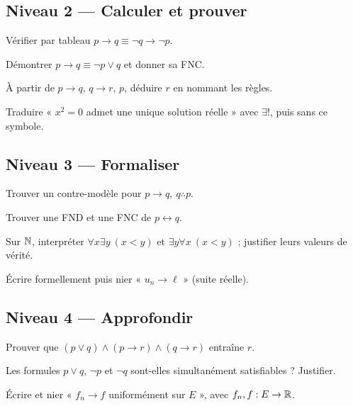 \subsection*{Niveau 2 — Calculer et prouver}
\begin{exercice}[Contraposée]\label{ex:prop:5}Vérifier par tableau $p\to q\equiv\neg q\to\neg p$.\end{exercice}
\begin{exercice}[Équivalence]\label{ex:prop:6}Démontrer $p\to q\equiv\neg p\vee q$ et donner sa FNC.\end{exercice}
\begin{exercice}[Inférence]\label{ex:prop:7}À partir de $p\to q$, $q\to r$, $p$, déduire $r$ en nommant les règles.\end{exercice}
\begin{exercice}[Unicité]\label{ex:prop:8}Traduire « $x^2=0$ admet une unique solution réelle » avec $\exists!$, puis sans ce symbole.\end{exercice}
\subsection*{Niveau 3 — Formaliser}
\begin{exercice}\label{ex:prop:9}Trouver un contre-modèle pour $p\to q,\ q\therefore p$.\end{exercice}
\begin{exercice}\label{ex:prop:10}Trouver une FND et une FNC de $p\leftrightarrow q$.\end{exercice}
\begin{exercice}\label{ex:prop:11}Sur $\mathbb N$, interpréter $\forall x\exists y\ (x<y)$ et $\exists y\forall x\ (x<y)$ ; justifier leurs valeurs de vérité.\end{exercice}
\begin{exercice}\label{ex:prop:12}Écrire formellement puis nier « $u_n\to\ell$ » (suite réelle).\end{exercice}
\subsection*{Niveau 4 — Approfondir}
\begin{exercice}\label{ex:prop:13}Prouver que $(p\vee q)\wedge(p\to r)\wedge(q\to r)$ entraîne $r$.\end{exercice}
\begin{exercice}\label{ex:prop:14}Les formules $p\vee q$, $\neg p$ et $\neg q$ sont-elles simultanément satisfiables ? Justifier.\end{exercice}
\begin{exercice}\label{ex:prop:15}Écrire et nier « $f_n\to f$ uniformément sur $E$ », avec $f_n,f:E\to\mathbb R$.\end{exercice}
